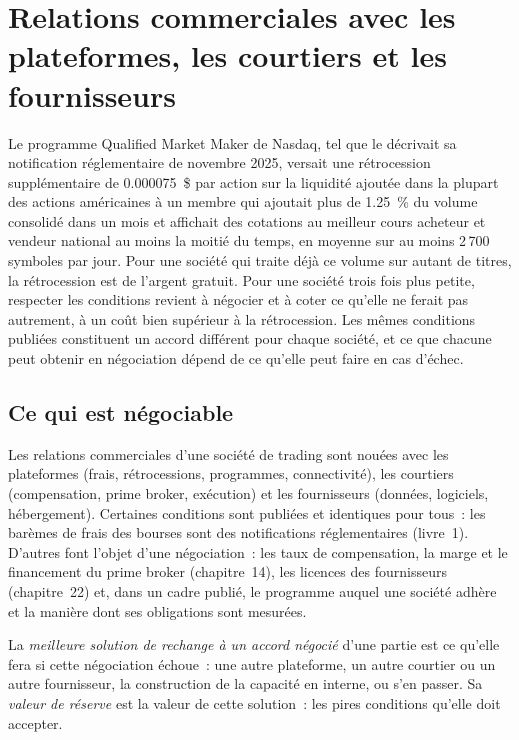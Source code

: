 \chapter{Relations commerciales avec les plateformes, les courtiers et les fournisseurs}\label{ch:fm:commercial-relationships-with-venues-brokers-and-vendors}

Le programme Qualified Market Maker de Nasdaq, tel que le décrivait sa notification réglementaire de novembre 2025, versait une rétrocession supplémentaire de 0.000075~\$ par action sur la liquidité
ajoutée dans la plupart des actions américaines à un membre qui ajoutait plus de 1.25~\% du volume consolidé dans un mois et affichait des cotations au meilleur cours acheteur et vendeur national au
moins la moitié du temps, en moyenne sur au moins 2\,700 symboles par jour. Pour une société qui traite déjà ce volume sur autant de titres, la rétrocession est
de l'argent gratuit. Pour une société trois fois plus petite, respecter les conditions revient à négocier et à coter ce qu'elle ne ferait pas autrement, à un coût bien supérieur à la
rétrocession. Les mêmes conditions publiées constituent un accord différent pour chaque société, et ce que chacune peut obtenir en négociation dépend de ce qu'elle peut faire en cas d'échec.

\section{Ce qui est négociable}

Les relations commerciales d'une société de trading sont nouées avec les plateformes (frais, rétrocessions, programmes, connectivité), les courtiers (compensation, prime broker,
exécution) et les fournisseurs (données, logiciels, hébergement). Certaines conditions sont publiées et identiques pour tous~: les barèmes de frais des bourses sont des notifications réglementaires (livre~1). D'autres
font l'objet d'une négociation~: les taux de compensation, la marge et le financement du prime broker (chapitre~14), les licences des fournisseurs (chapitre~22) et, dans un cadre publié,
le programme auquel une société adhère et la manière dont ses obligations sont mesurées.

\begin{definition}\label{def:fm:commercial-relationships-with-venues-brokers-and-vendors:batna}
La \emph{meilleure solution de rechange à un accord négocié} d'une partie est ce qu'elle fera si cette
négociation échoue~: une autre plateforme, un autre courtier ou un autre fournisseur, la construction de la capacité en interne, ou s'en passer. Sa \emph{valeur de
réserve} est la valeur de cette solution~: les pires conditions qu'elle doit accepter.
\end{definition}

